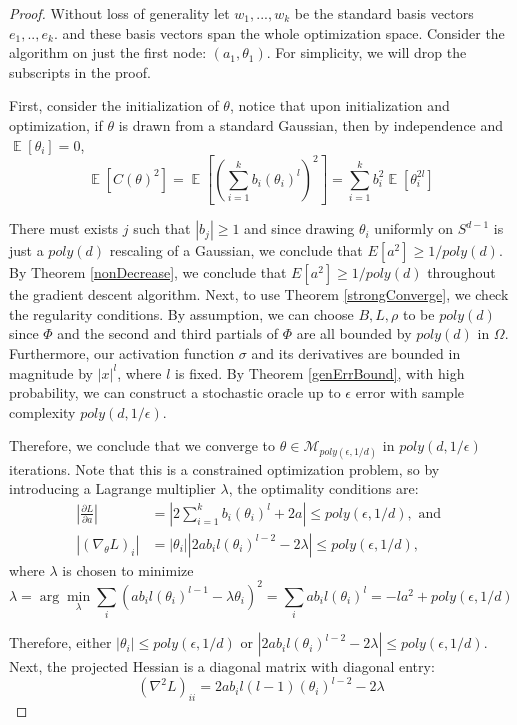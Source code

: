 \documentclass{article}
\DeclareMathOperator*{\expt}{\mathbb{E}}
\newcommand{\pd}[2]{\frac{\partial#1}{\partial#2}}
\begin{document}

\begin{proof}
Without loss of generality let $w_1,...,w_k$ be the standard basis vectors $e_1,..,e_k$. and these basis vectors span the whole optimization space. Consider the algorithm on just the first node: $(a_1,\theta_1)$. For simplicity, we will drop the subscripts in the proof. 

First, consider the initialization of $\theta$, notice that upon initialization and optimization, if $\theta$ is drawn from a standard Gaussian, then by independence and $\expt[\theta_i] = 0$,
%
\[\expt[C(\theta)^2] = \expt\left[\left(\sum_{i=1}^k  b_i (\theta_i)^l\right)^2\right] = \sum_{i=1}^k b_i^2 \expt[\theta_i^{2l}]\]

There must exists $j$ such that $|b_j|\geq 1$ and since drawing $\theta_i$ uniformly on $S^{d-1}$ is just a $poly(d)$ rescaling of a Gaussian, we conclude that $E[a^2]\geq1/poly(d)$. By Theorem \ref{nonDecrease}, we conclude that $E[a^2] \geq 1/poly(d)$ throughout the gradient descent algorithm. Next, to use Theorem \ref{strongConverge}, we check the regularity conditions. By assumption, we can choose $B, L, \rho$ to be $poly(d)$ since $\Phi$ and the second and third partials of $\Phi$ are all bounded by $poly(d)$ in $\Omega$. Furthermore, our activation function $\sigma$ and its derivatives are bounded in magnitude by $|x|^{l}$, where $l$ is fixed. By Theorem \ref{genErrBound}, with high probability, we can construct a stochastic oracle up to $\epsilon$ error with sample complexity $poly(d,1/\epsilon)$.


Therefore, we conclude that we converge to $\theta \in \mathcal{M}_{poly(\epsilon,1/d)}$ in $poly(d,1/\epsilon)$ iterations. Note that this is a constrained optimization problem, so by introducing a Lagrange multiplier $\lambda$, the optimality conditions are:
%
\begin{align*}
|\pd{L}{a}| & = |2\sum_{i=1}^k b_i (\theta_i)^l + 2a| \leq poly(\epsilon,1/d), \textrm{ and } \\
%
 |(\nabla_\theta L)_i| & = |\theta_i||2ab_il(\theta_i)^{l-2}  -2\lambda| \leq poly(\epsilon,1/d) ,
\end{align*}
where $\lambda$ is chosen to minimize
\[\lambda = \arg \min_\lambda \sum_i (ab_i l (\theta_i)^{l-1} - \lambda\theta_i)^2 = \sum_i ab_i l (\theta_i)^l = -la^2 + poly(\epsilon,1/d) \]

Therefore, either $|\theta_i| \leq poly(\epsilon,1/d)$ or $|2ab_il(\theta_i)^{l-2} - 2 \lambda |\leq poly(\epsilon,1/d)$. Next, the projected Hessian is a diagonal matrix with diagonal entry: 
%
\[(\nabla^2 L)_{ii} = 2a b_i l(l-1)(\theta_i)^{l-2} - 2 \lambda\]


\end{proof}
\end{document}
